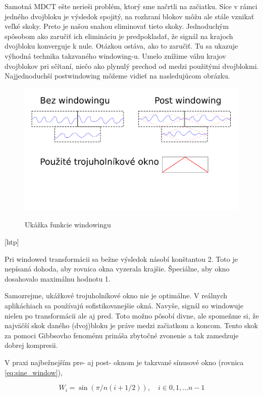 Samotná MDCT ešte nerieši problém, ktorý sme načrtli na začiatku.
Síce v rámci jedného dvojbloku je výsledok spojitý,
na rozhraní blokov môžu ale stále vznikať veľké skoky.
Preto je našou snahou eliminovať tieto skoky. Jednoduchým spôsobom ako
zaručiť ich elimináciu je predpokladať, že signál na krajoch dvojbloku
konverguje k nule. Otázkou ostáva, ako to zaručiť. Tu sa ukazuje
výhodná technika takzvaného windowing-u. Umelo znížime váhu krajov
dvojblokov pri sčítaní, niečo ako plynulý prechod od medzi použitými
dvojblokmi. Najjednoduchší postwindowing môžeme vidieť na
nasledujúcom obrázku.
\begin{figure}[htp]
    \centering
    \includegraphics{obrazky/informatika/audio/post_windowing}
    \label{fig:post_windowing}
    \caption{Ukážka funkcie windowingu}
\end{figure}[htp]
\begin{poznamka}
    Pri windowed transformácii sa bežne výsledok násobí konštantou 2.
    Toto je nepísaná dohoda, aby rovnica okna vyzerala krajšie.
    Špeciálne, aby okno dosahovalo maximálnu hodnotu 1.
\end{poznamka}
Samozrejme, ukážkové trojuholníkové okno nie je optimálne.
V reálnych aplikáchiach sa používajú sofistikovanejšie okná.
Navyše, signál so windowuje nielen po transformácii ale aj pred. Toto
možno pôsobí divne, ale spomeňme si, že najväčší skok daného
(dvoj)bloku je práve medzi začiatkom a koncom. Tento skok za pomoci
Gibbsovho fenoménu prináša zbytočné zvonenie a tak zamedzuje dobrej
kompresii.

V praxi najbežnejším pre- aj post- oknom je takzvané sínusové okno
(rovnica \ref{eq:sine_window}),

\begin{equation}
    W_i = \sin(\pi/n (i + 1/2)),\quad  i\in 0,1,\dots n-1
    \label{eq:sine_window}
\end{equation}

